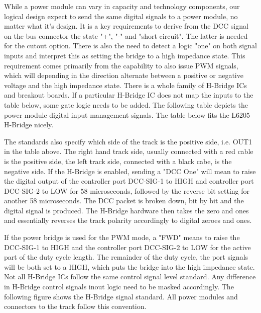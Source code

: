 While a power module can vary in capacity and technology components, our logical design expect to send the same digital signals to a power module, no matter what it's design. It is a key requirements to derive from the DCC signal on the bus connector the state "+", "-" and "short circuit". The latter is needed for the cutout option. There is also the need to detect a logic "one" on both signal inputs and interpret this as setting the bridge to a high impedance state. This requirement comes primarily from the capability to also issue PWM signals, which will depending in the direction alternate between a positive or negative voltage and the high impedance state. There is a whole family of H-Bridge ICs and breakout boards. If a particular H-Bridge IC does not map the inputs to the table below, some gate logic needs to be added. The following table depicts the power module digital input management signals. The table below fits the L6205 H-Bridge nicely.


The standards also specify which side of the track is the positive side, i.e. OUT1 in the table above. The right hand track side, usually connected with a red cable is the positive side, the left track side, connected with a black cabe, is the negative side. If the H-Bridge is enabled, sending a "DCC One" will mean to raise the digital output of the controller port DCC-SIG-1 to HIGH and controller port DCC-SIG-2 to LOW for 58 microseconds, followed by the reverse bit setting for another 58 microseconds. The DCC packet is broken down, bit by bit and the digital signal is produced. The H-Bridge hardware then takes the zero and ones and essentially reverses the track polarity accordingly to digital zeroes and ones.

If the power bridge is used for the PWM mode, a "FWD" means to raise  the DCC-SIG-1 to HIGH and the controller port DCC-SIG-2 to LOW for the active part of the duty cycle length. The remainder of the duty cycle, the port signals will be both set to a HIGH, which puts the bridge into the high impedance state. Not all H-Bridge ICs follow the same control signal level standard. Any difference in H-Bridge control signals inout logic need to be masked accordingly. The following figure shows the H-Bridge signal standard. All power modules and connectors to the track follow this convention.

